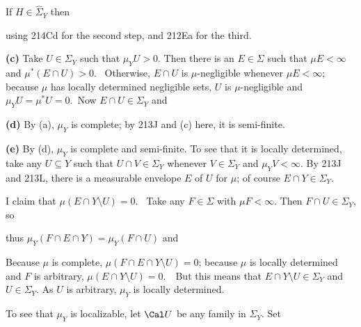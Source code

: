 {\noindent If $H\in\hat\Sigma_Y$ then


\noindent using 214Cd for the second step, and 212Ea for the third.

\medskip

{\bf (c)} Take $U\in\Sigma_Y$ such
that $\mu_YU>0$.   Then there is an $E\in\Sigma$ such that
$\mu E<\infty$
and $\mu^*(E\cap U)>0$.   \Prf\Quer\ Otherwise, $E\cap U$ is
$\mu$-negligible whenever $\mu E<\infty$;  because $\mu$ has locally determined negligible sets, $U$ is $\mu$-negligible and $\mu_YU=\mu^*U=0$.\ \Bang\QeD   Now
$E\cap U\in\Sigma_Y$ and


\medskip

{\bf (d)} By (a), $\mu_Y$ is complete;  by 213J and (c) here, it is
semi-finite.

\medskip

{\bf (e)} By (d), $\mu_Y$ is complete and semi-finite.
To see that it is locally
determined, take any $U\subseteq Y$ such that $U\cap V\in\Sigma_Y$
whenever $V\in\Sigma_Y$ and $\mu_YV<\infty$.   By 213J and 213L,
there is a
measurable envelope $E$ of $U$ for $\mu$;  of course
$E\cap Y\in\Sigma_Y$.

I claim that $\mu(E\cap Y\setminus U)=0$.   \Prf\ Take any $F\in\Sigma$
with $\mu F<\infty$.   Then $F\cap U\in\Sigma_Y$, so

\noindent thus $\mu_Y(F\cap E\cap Y)=\mu_Y(F\cap U)$ and


\noindent Because $\mu$ is complete, $\mu(F\cap E\cap Y\setminus U)=0$;
because $\mu$ is locally determined and $F$ is arbitrary,
$\mu(E\cap Y\setminus U)=0$.\ \QeD\  But this means that
$E\cap Y\setminus U\in\Sigma_Y$ and $U\in\Sigma_Y$.   As $U$ is
arbitrary, $\mu_Y$ is locally determined.

To see that $\mu_Y$ is localizable,
let $\Cal U$ be any family in $\Sigma_Y$.   Set


}
